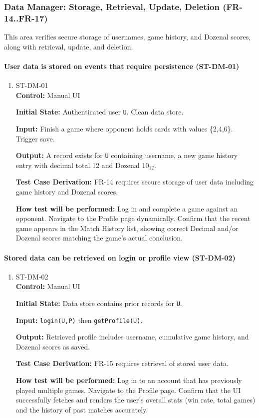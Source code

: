 \documentclass[12pt, titlepage]{article}
\begin{document}
\subsubsection{Data Manager: Storage, Retrieval, Update, Deletion (FR-14..FR-17)}

This area verifies secure storage of usernames, game history, and Dozenal scores, along with retrieval, update, and deletion.

\paragraph{User data is stored on events that require persistence (ST-DM-01)}
\begin{enumerate}
\item{ST-DM-01\\}
\textbf{Control:} Manual UI

\textbf{Initial State:} Authenticated user \texttt{U}. Clean data store.

\textbf{Input:} Finish a game where opponent holds cards with values \{2,4,6\}. Trigger save.

\textbf{Output:} A record exists for \texttt{U} containing username, a new game history entry with decimal total 12 and Dozenal 10$_{12}$.

\textbf{Test Case Derivation:} FR-14 requires secure storage of user data including game history and Dozenal scores.

\textbf{How test will be performed:} Log in and complete a game against an opponent. Navigate to the Profile page dynamically. Confirm that the recent game appears in the Match History list, showing correct Decimal and/or Dozenal scores matching the game's actual conclusion.
\end{enumerate}

\paragraph{Stored data can be retrieved on login or profile view (ST-DM-02)}
\begin{enumerate}
\item{ST-DM-02\\}
\textbf{Control:} Manual UI

\textbf{Initial State:} Data store contains prior records for \texttt{U}.

\textbf{Input:} \texttt{login(U,P)} then \texttt{getProfile(U)}.

\textbf{Output:} Retrieved profile includes username, cumulative game history, and Dozenal scores as saved.

\textbf{Test Case Derivation:} FR-15 requires retrieval of stored user data.

\textbf{How test will be performed:} Log in to an account that has previously played multiple games. Navigate to the Profile page. Confirm that the UI successfully fetches and renders the user's overall stats (win rate, total games) and the history of past matches accurately.
\end{enumerate}
\end{document}
